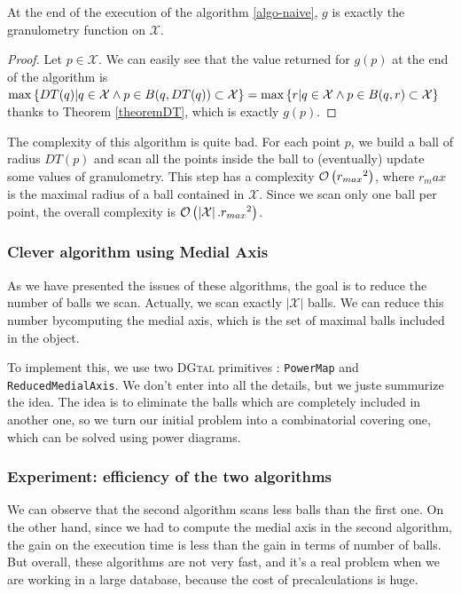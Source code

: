 \begin{theo}
	At the end of the execution of the algorithm \ref{algo-naive}, $g$ is exactly the granulometry function on $\mathcal{X}$.
\end{theo}

\begin{proof}
Let $p \in \mathcal{X}$. We can easily see that the value returned for $g(p)$ at the end of the algorithm is 
$ \operatorname{max} \left\{ DT(q) | q \in \mathcal{X} \wedge p \in B(q,DT(q)) \subset \mathcal{X} \right\} 
= \operatorname{max} \left\{ r | q \in \mathcal{X} \wedge p \in B(q,r) \subset \mathcal{X} \right\}$ thanks to Theorem \ref{theoremDT}, which is exactly $g(p)$.
\end{proof}

The complexity of this algorithm is quite bad. For each point $p$, we build a ball of radius $DT(p)$ and scan all the points inside the ball to (eventually) update some values of granulometry. This step has a complexity $\mathcal O \left( {r_{max}}^2 \right)$, where $r_max$ is the maximal radius of a ball contained in $\mathcal{X}$. Since we scan only one ball per point, the overall complexity is $\mathcal O \left( \left| \mathcal{X} \right|. {r_{max}}^2 \right)$.

\subsubsection{Clever algorithm using Medial Axis}

As we have presented the issues of these algorithms, the goal is to reduce the number of balls we scan. Actually, we scan exactly $\left| \mathcal{X} \right|$ balls. We can reduce this number bycomputing the medial axis, which is the set of maximal balls included in the object.

To implement this, we use two \textsc{DGtal} primitives : \texttt{PowerMap} and \texttt{ReducedMedialAxis}. We don't enter into all the details, but we juste summurize the idea. The idea is to eliminate the balls which are completely included in another one, so we turn our initial problem into a combinatorial covering one, which can be solved using power diagrams. 

\subsubsection{Experiment: efficiency of the two algorithms}

We can observe that the second algorithm scans less balls than the first one. On the other hand, since we had to compute the medial axis in the second algorithm, the gain on the execution time is less than the gain in terms of number of balls.
But overall, these algorithms are not very fast, and it's a real problem when we are working in a large database, because the cost of precalculations is huge.

